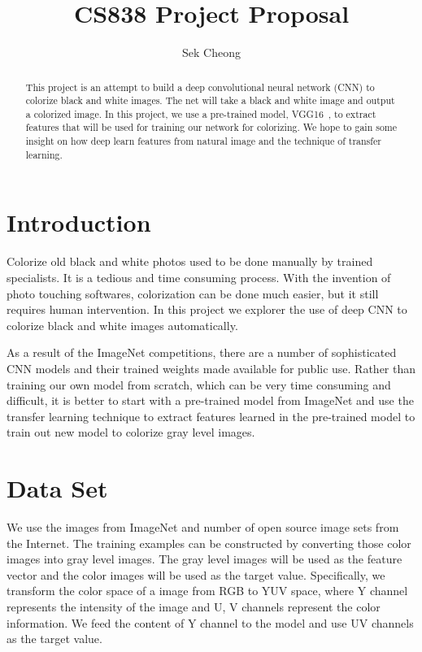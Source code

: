 \documentclass[12pt]{article}
\begin{document}
\title{CS838 Project Proposal}
\author{Sek Cheong}
\maketitle

\begin{abstract}
This project is an attempt to build a deep convolutional neural network (CNN) to colorize black and white images. The net will take a black and white image and output a colorized image. In this project, we use a pre-trained model, VGG16~\cite{vgg16}, to extract features that will be used for training our network for colorizing. We hope to gain some insight on how deep learn features from natural image and the technique of transfer learning.
\end{abstract}

\section{Introduction}
Colorize old black and white photos used to be done manually by trained specialists. It is a tedious and time consuming process. With the invention of photo touching softwares, colorization can be done much easier, but it still requires human intervention. In this project we explorer the use of deep CNN to colorize black and white images automatically. 


As a result of the ImageNet competitions, there are a number of sophisticated CNN models and their trained weights made available for public use. Rather than training our own model from scratch, which can be very time consuming and difficult, it is better to start with a pre-trained model from ImageNet and use the transfer learning technique to extract features learned in the pre-trained model to train out new model to colorize gray level images.


\section{Data Set}
We use the images from ImageNet and number of open source image sets from the Internet. The training examples can be constructed by converting those color images into gray level images. The gray level images will be used as the feature vector and the color images will be used as the target value. Specifically, we transform the color space of a image from RGB to YUV space, where Y channel represents the intensity of the image and U, V channels represent the color information. We feed the content of Y channel to the model and use UV channels as the target value. 
\end{document}
